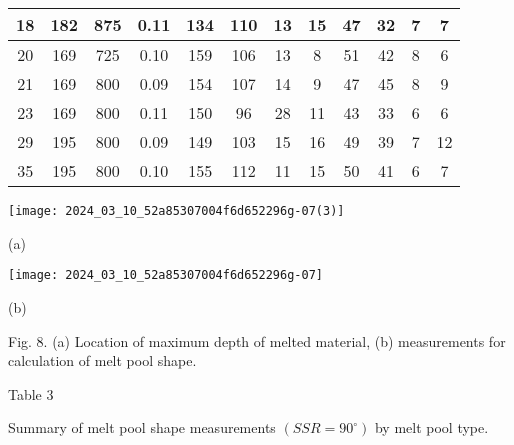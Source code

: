\documentclass[10pt]{article}
\begin{document}
\begin{center}
\begin{tabular}{|c|c|c|c|c|c|c|c|c|c|c|c|}
\hline
18 & 182 & 875 & 0.11 & 134 & 110 & 13 & 15 & 47 & 32 & 7 & 7 \\
\hline
20 & 169 & 725 & 0.10 & 159 & 106 & 13 & 8 & 51 & 42 & 8 & 6 \\
\hline
21 & 169 & 800 & 0.09 & 154 & 107 & 14 & 9 & 47 & 45 & 8 & 9 \\
\hline
23 & 169 & 800 & 0.11 & 150 & 96 & 28 & 11 & 43 & 33 & 6 & 6 \\
\hline
29 & 195 & 800 & 0.09 & 149 & 103 & 15 & 16 & 49 & 39 & 7 & 12 \\
\hline
35 & 195 & 800 & 0.10 & 155 & 112 & 11 & 15 & 50 & 41 & 6 & 7 \\
\hline
\end{tabular}
\end{center}

\begin{center}
\texttt{[image: 2024\_03\_10\_52a85307004f6d652296g-07(3)]}
\end{center}

(a)

\begin{center}
\texttt{[image: 2024\_03\_10\_52a85307004f6d652296g-07]}
\end{center}

(b)

Fig. 8. (a) Location of maximum depth of melted material, (b) measurements for calculation of melt pool shape.

Table 3

Summary of melt pool shape measurements $\left(S S R=90^{\circ}\right)$ by melt pool type.
\end{document}
